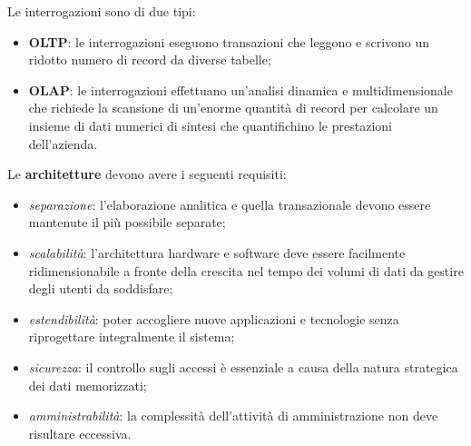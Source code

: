 \documentclass[a4paper, notitlepage, 9pt]{extreport}
\begin{document}
\noindent
Le interrogazioni sono di due tipi:
\begin{itemize}
	\item \textbf{OLTP}: le interrogazioni eseguono transazioni che leggono e scrivono un ridotto numero di record da diverse tabelle;
	\item \textbf{OLAP}: le interrogazioni effettuano un’analisi dinamica e multidimensionale che richiede la scansione di un’enorme quantità di record per calcolare un insieme di dati numerici di sintesi che quantifichino le prestazioni dell’azienda.
\end{itemize}
Le \textbf{architetture} devono avere i seguenti requisiti:
\begin{itemize}
	\item \textit{separazione}: l’elaborazione analitica e quella transazionale devono essere mantenute il più possibile separate;
	\item \textit{scalabilità}: l’architettura hardware e software deve essere facilmente ridimensionabile a fronte della crescita nel tempo dei volumi di dati da gestire degli utenti da soddisfare;
	\item \textit{estendibilità}: poter accogliere nuove applicazioni e tecnologie senza riprogettare integralmente il sistema;
	\item \textit{sicurezza}: il controllo sugli accessi è essenziale a causa della natura strategica dei dati memorizzati;
	\item \textit{amministrabilità}: la complessità dell’attività di amministrazione non deve risultare eccessiva.
\end{itemize}
\end{document}
